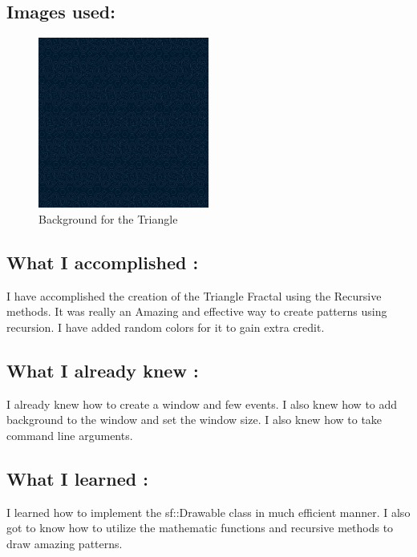 \subsection{Images used:}\label{sec:ps2:img}
\begin{figure}[h]
    \centering
    \includegraphics[width=0.5\textwidth]{ps2/backg.jpg}
    \caption{Background for the Triangle}
    \label{fig:decode}
\end{figure}


\subsection{What I accomplished :}\label{sec:ps2:accomplish}

I have accomplished the creation of the Triangle Fractal using the Recursive methods. It was really an Amazing and effective way to create patterns using recursion. I have added random colors for it to gain extra credit.

\subsection{What I already knew :}\label{sec:ps2:knew}

I already knew how to create a window and few events. I also knew how to add background to the window and set the window size. I also knew how to take command line arguments.

\subsection{What I learned :}\label{sec:ps2:learn}

I learned how to implement the sf::Drawable class in much efficient manner. I also got to know how to utilize the mathematic functions and recursive methods to draw amazing patterns.

